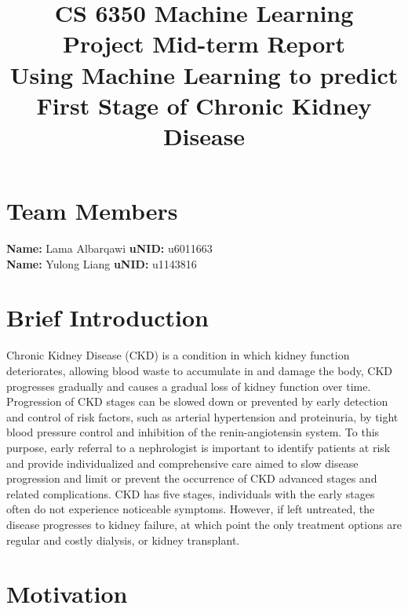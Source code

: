 \documentclass[11pt]{article}
\begin{document}
\title{CS 6350 Machine Learning\\{\bf Project Mid-term Report}\\{Using Machine Learning to predict First Stage of Chronic Kidney Disease}}
\maketitle

\section{Team Members}
\textbf{Name:} Lama Albarqawi \hspace{3em} \textbf{uNID:} u6011663\\
\textbf{Name:} Yulong Liang \hspace{4.4em} \textbf{uNID:} u1143816

\section{Brief Introduction}


 Chronic Kidney Disease (CKD) is a condition in which kidney function deteriorates, allowing blood waste to accumulate in and damage the body, CKD progresses gradually and causes a gradual loss of kidney function over time. Progression of CKD stages can be slowed down or prevented by early detection and control of risk factors, such as arterial hypertension and proteinuria, by tight blood pressure control and inhibition of the renin-angiotensin system. To this purpose, early referral to a nephrologist is important to identify patients at risk and provide individualized and comprehensive care aimed to slow disease progression and limit or prevent the occurrence of CKD advanced stages and related complications. 
CKD has five stages, individuals with the early stages often do not experience noticeable symptoms.
However, if left untreated, the disease progresses to kidney failure, at which point the only
treatment options are regular and costly dialysis, or kidney transplant.

\section{Motivation}
\end{document}
